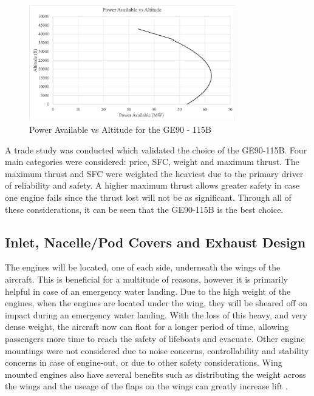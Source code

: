 \begin{figure} [h!]
    \centering
    \includegraphics[width=0.8\textwidth]{Photos/propulsion/poweravailable.png}
    \caption{Power Available vs Altitude for the GE90 - 115B}
    \label{fig:poweravailable}
\end{figure}

A trade study was conducted which validated the choice of the GE90-115B. Four main categories were considered: price, SFC, weight and maximum thrust. The maximum thrust and SFC were weighted the heaviest due to the primary driver of reliability and safety. A higher maximum thrust allows greater safety in case one engine fails since the thrust lost will not be as significant. Through all of these considerations, it can be seen that the GE90-115B is the best choice.

\subsection{Inlet, Nacelle/Pod Covers and Exhaust Design}

The engines will be located, one of each side, underneath the wings of the aircraft. This is beneficial for a multitude of reasons, however it is primarily helpful in case of an emergency water landing. Due to the high weight of the engines, when the engines are located under the wing, they will be sheared off on impact during an emergency water landing. With the loss of this heavy, and very dense weight, the aircraft now can float for a longer period of time, allowing passengers more time to reach the safety of lifeboats and evacuate. Other engine mountings were not considered due to noise concerns, controllability and stability concerns in case of engine-out, or due to other safety considerations. Wing mounted engines also have several benefits such as distributing the weight across the wings and the useage of the flaps on the wings can greatly increase lift \cite{raymer}.


